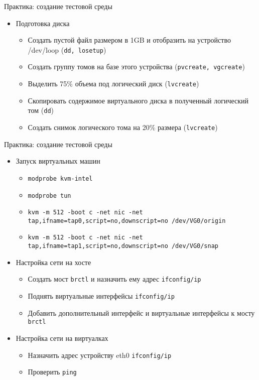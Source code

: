 \begin{frame}{Практика: создание тестовой среды}
	\begin{itemize}
		\item Подготовка диска
			\begin{itemize}
				\item Создать пустой файл размером в 1GB и отобразить на устройство
					/dev/loop ({\tt dd, losetup})
				\item Создать группу томов на базе этого устройства ({\tt pvcreate, vgcreate})
				\item Выделить 75\% объема под логический диск ({\tt lvcreate})
				\item Скопировать содержимое виртуального диска в полученный логический том ({\tt dd})
				\item Создать снимок логического тома на 20\% размера ({\tt lvcreate})
			\end{itemize}
	\end{itemize}
\end{frame}

\begin{frame}{Практика: создание тестовой среды}
	\begin{itemize}
		\item Запуск виртуальных машин
			\begin{itemize}
				\item {\tt modprobe kvm-intel} 
				\item {\tt modprobe tun} 
				\item {\tt kvm -m 512 -boot c -net nic -net tap,ifname=tap0,script=no,downscript=no /dev/VG0/origin } 
				\item {\tt kvm -m 512 -boot c -net nic -net tap,ifname=tap1,script=no,downscript=no /dev/VG0/snap } 
			\end{itemize}
			\pause
		\item Настройка сети на хосте
			\begin{itemize}
				\item Создать мост {\tt brctl} и назначить ему адрес {\tt ifconfig/ip}
				\item Поднять виртуальные интерфейсы {\tt ifconfig/ip}
				\item Добавить дополнительный интерфейс и виртуальные интерфейсы к мосту {\tt brctl}
			\end{itemize}
			\pause
		\item Настройка сети на виртуалках
			\begin{itemize}
				\item Назначить адрес устройству eth0 {\tt ifconfig/ip}
				\item Проверить {\tt ping}
			\end{itemize}

	\end{itemize}
\end{frame}





